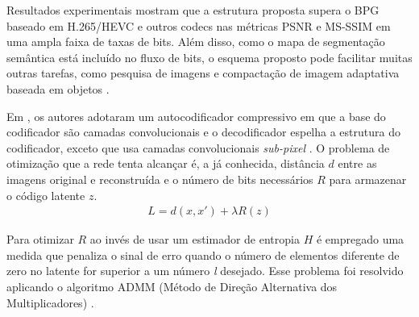 
Resultados experimentais mostram que a estrutura proposta supera o BPG baseado em H.265/HEVC e outros codecs nas métricas PSNR e MS-SSIM em uma ampla faixa de taxas de bits. Além disso, como o mapa de segmentação semântica está incluído no fluxo de bits, o esquema proposto pode facilitar muitas outras tarefas, como pesquisa de imagens e compactação de imagem adaptativa baseada em objetos \cite{akbari2019dsslic}.


Em \cite{zhao1901cae}, os autores adotaram um autocodificador compressivo em que a base do codificador são camadas convolucionais e o decodificador espelha a estrutura do codificador, exceto que usa  camadas convolucionais \textit{sub-pixel} \cite{li2018learning}. O problema de otimização que a rede tenta alcançar é, a já conhecida, distância $d$ entre as imagens original e reconstruída e o número de bits necessários $R$ para armazenar o código latente $z$.
\begin{equation}
\begin{aligned}
L = d(x,x') + \lambda R(z) 
\end{aligned}
\end{equation}

Para otimizar $R$ ao invés de usar um estimador de entropia $H$ é empregado uma medida que penaliza o sinal de erro quando o número de elementos diferente de zero no latente for superior a um número \textit{l} desejado. Esse problema foi resolvido aplicando o algoritmo ADMM (Método de Direção Alternativa dos Multiplicadores) \cite{ye2018progressive}. 




